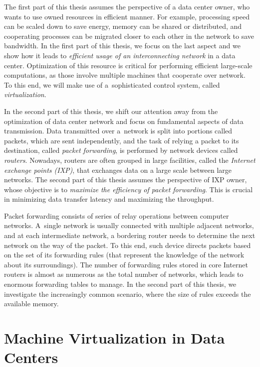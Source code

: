 \medskip
The first part of this thesis assumes the perspective of a data center owner, who wants to use owned resources in efficient manner.
For example, processing speed can be scaled down to save energy, memory can be shared or distributed, and cooperating processes can be migrated closer to each other in the network to save bandwidth.
In the first part of this thesis, we focus on the last aspect and we show how it leads to
\emph{efficient usage of an interconnecting network} in a data center.
Optimization of this resource is critical for performing efficient large-scale computations, as those involve multiple machines that cooperate over network.
To this end, we will make use of a~sophisticated control system, called \emph{virtualization}.

\medskip

In the second part of this thesis, we shift our attention away from the optimization of data center network and focus on fundamental aspects of data transmission.
Data transmitted over a~network is split into portions called packets, which are sent independently, and the task of relying a packet to its destination, called \emph{packet forwarding}, is performed by network devices called \emph{routers}.
Nowadays, routers are often grouped in large facilities, called the \emph{Internet exchange points (IXP)}, that exchanges data on a large scale between large networks.
The second part of this thesis assumes the perspective of IXP owner, whose objective is to \emph{maximize the efficiency of packet forwarding}.
This is crucial in minimizing data transfer latency and maximizing the throughput.


Packet forwarding consists of series of relay operations between computer networks.
A~single network is usually connected with multiple adjacent networks, and at each intermediate network, a bordering router needs to determine the next network on the way of the packet.
To this end, such device directs packets based on the set of its forwarding rules (that represent the knowledge of the network about its surroundings).
The number of forwarding rules stored in core Internet routers is almost as numerous as the total number of networks, which leads to enormous forwarding tables to manage.
In the second part of this thesis, we investigate the increasingly common scenario, where the size of rules exceeds the available memory.

\section{Machine Virtualization in Data Centers}
\label{sec:intro-machine-virtualization}

